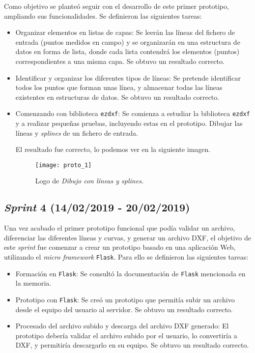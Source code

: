 Como objetivo se planteó seguir con el desarrollo de este primer prototipo, ampliando sus funcionalidades. Se definieron las siguientes tareas:

\begin{itemize}
\item Organizar elementos en listas de capas: Se leerán las líneas del fichero de entrada (puntos medidos en campo) y se organizarán en una estructura de datos en forma de lista, donde cada lista contendrá los elementos (puntos) correspondientes a una misma capa. Se obtuvo un resultado correcto.

\item Identificar y organizar los diferentes tipos de líneas: Se pretende identificar todos los puntos que forman unas línea, y almacenar todas las líneas existentes en estructuras de datos. Se obtuvo un resultado correcto.

\item Comenzando con biblioteca \texttt{ezdxf}: Se comienza a estudiar la biblioteca \texttt{ezdxf} y a realizar pequeñas pruebas, incluyendo estas en el prototipo. Dibujar las líneas y \emph{splines} de un fichero de entrada.

El resultado fue correcto, lo podemos ver en la siguiente imagen.

\begin{figure}[H]
	\centering
	\texttt{[image: proto\_1]}
	\caption{Logo de \emph{Dibujo con líneas y \emph{splines}.}}
	\label{fig:proto_1}
\end{figure}


\end{itemize}




\subsection{\emph{Sprint} 4 (14/02/2019 - 20/02/2019)}

Una vez acabado el primer prototipo funcional que podía validar un archivo, diferenciar las diferentes líneas y curvas, y generar un archivo DXF, el objetivo de este \emph{sprint} fue comenzar a crear un prototipo  basado en una aplicación Web, utilizando el \emph{micro framework} \texttt{Flask}. Para ello se definieron las siguientes tareas:

\begin{itemize}
\item Formación en \texttt{Flask}: Se consultó la documentación de \texttt{Flask} mencionada en la memoria.

\item Prototipo con \texttt{Flask}: Se creó un prototipo que permitía subir un archivo desde el equipo del usuario al servidor. Se obtuvo un resultado correcto.

\item Procesado del archivo subido y descarga del archivo DXF generado: El prototipo debería validar el archivo subido por el usuario, lo convertiría a DXF, y permitiría descargarlo en su equipo. Se obtuvo un resultado correcto.

\end{itemize}
 
